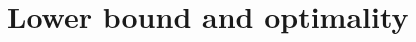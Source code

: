 \documentclass[10pt, aspectratio=169, xcolor={table}]{beamer}
\newcommand{\TODO}[1]{{\color{red}\textbf{[TODO]} #1}}
\renewcommand{\TODO}[1]{}
\begin{document}
%
%
%
%

\section{Lower bound and optimality}
\end{document}
